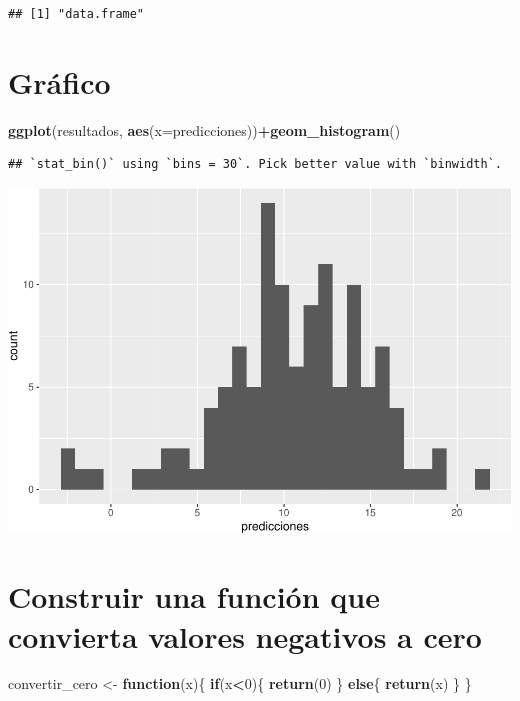 \documentclass[
]{article}
\newenvironment{Shaded}{\begin{snugshade}}{\end{snugshade}}
\newcommand{\ControlFlowTok}[1]{\textcolor[rgb]{0.13,0.29,0.53}{\textbf{#1}}}
\newcommand{\DataTypeTok}[1]{\textcolor[rgb]{0.13,0.29,0.53}{#1}}
\newcommand{\DecValTok}[1]{\textcolor[rgb]{0.00,0.00,0.81}{#1}}
\newcommand{\KeywordTok}[1]{\textcolor[rgb]{0.13,0.29,0.53}{\textbf{#1}}}
\newcommand{\NormalTok}[1]{#1}
\newcommand{\OperatorTok}[1]{\textcolor[rgb]{0.81,0.36,0.00}{\textbf{#1}}}
\newcommand{\StringTok}[1]{\textcolor[rgb]{0.31,0.60,0.02}{#1}}
\begin{document}
\begin{verbatim}
## [1] "data.frame"
\end{verbatim}

\hypertarget{gruxe1fico}{%
\section{Gráfico}\label{gruxe1fico}}

\begin{Shaded}
\begin{Highlighting}[]
\KeywordTok{ggplot}\NormalTok{(resultados, }\KeywordTok{aes}\NormalTok{(}\DataTypeTok{x=}\NormalTok{predicciones))}\OperatorTok{+}\KeywordTok{geom_histogram}\NormalTok{()}
\end{Highlighting}
\end{Shaded}

\begin{verbatim}
## `stat_bin()` using `bins = 30`. Pick better value with `binwidth`.
\end{verbatim}

\includegraphics{Lab2_files/figure-latex/unnamed-chunk-18-1.pdf}

\hypertarget{construir-una-funciuxf3n-que-convierta-valores-negativos-a-cero}{%
\section{Construir una función que convierta valores negativos a
cero}\label{construir-una-funciuxf3n-que-convierta-valores-negativos-a-cero}}

\begin{Shaded}
\begin{Highlighting}[]
\NormalTok{convertir_cero <-}\StringTok{ }\ControlFlowTok{function}\NormalTok{(x)\{}
  \ControlFlowTok{if}\NormalTok{(x}\OperatorTok{<}\DecValTok{0}\NormalTok{)\{}
    \KeywordTok{return}\NormalTok{(}\DecValTok{0}\NormalTok{)}
\NormalTok{    \}}
  \ControlFlowTok{else}\NormalTok{\{}
    \KeywordTok{return}\NormalTok{(x)}
\NormalTok{  \}}
\NormalTok{\}}
\end{Highlighting}
\end{Shaded}
\end{document}

